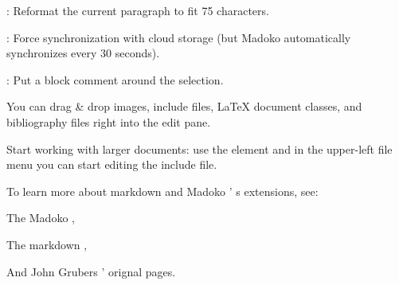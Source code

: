 \documentclass{book}
\begin{document}
\begin{mdUl}[class={list-star,compact},data-line={36}]%
\begin{mdLi}[data-line={36}]%
{}%
{}: Reformat the current paragraph to fit 75 characters.%
\end{mdLi}%
\begin{mdLi}[data-line={37}]%
{}%
{}: Force synchronization with cloud storage (but Madoko
automatically synchronizes every 30 seconds).%
\end{mdLi}%
\begin{mdLi}[data-line={39}]%
{}%
{}: Put a block comment around the selection.%
\end{mdLi}%
\begin{mdLi}[data-line={40}]%
{}You can drag%
{}{\&}%
{}drop images, include files, LaTeX document classes,
and bibliography files right into the edit pane.%
\end{mdLi}%
\begin{mdLi}[data-line={42}]%
{}Start working with larger documents: use the %
{}\mdCode[class={code}]{[INCLUDE=my-chapter]}%
{}
element and in the upper-left file menu you can start editing the
{}%
{} include file.%
\end{mdLi}%
\end{mdUl}%
\begin{mdP}[class={para-continue},data-line={46}]%
{}To learn more about markdown and Madoko%
{}{'}%
{}s extensions, see:%
\end{mdP}%
\begin{mdUl}[class={list-star,compact},data-line={48}]%
\begin{mdLi}[data-line={48}]%
{}The Madoko%
{}{\mdNbsp}%
{},%
\end{mdLi}%
\begin{mdLi}[data-line={49}]%
{}The markdown%
{}{\mdNbsp}%
{},%
\end{mdLi}%
\begin{mdLi}[data-line={50}]%
{}And John Grubers%
{}{'}%
{} orignal%
{}{\mdNbsp}%
{} pages.%
\end{mdLi}%
\end{mdUl}%
\end{document}

